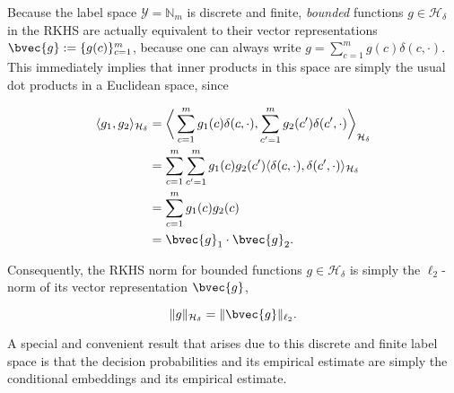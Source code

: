 \documentclass{article}
\begin{document}
	Because the label space $\mathcal{Y} = \mathbb{N}_{m}$ is discrete and finite, \textit{bounded} functions $g \in \mathcal{H}_{\delta}$ in the RKHS are actually equivalent to their vector representations $\bvec{g} := \{g(c)\}_{c = 1}^{m}$, because one can always write $g = \sum_{c = 1}^{m} g(c) \delta(c, \cdot)$. This immediately implies that inner products in this space are simply the usual dot products in a Euclidean space, since
	
	\begin{equation}
	\begin{aligned}
	\langle g_{1}, g_{2} \rangle_{\mathcal{H}_{\delta}} &= \bigg\langle \sum_{c = 1}^{m} g_{1}(c) \delta(c, \cdot), \sum_{c' = 1}^{m} g_{2}(c') \delta(c', \cdot)  \bigg\rangle_{\mathcal{H}_{\delta}} \\
	&= \sum_{c = 1}^{m} \sum_{c' = 1}^{m} g_{1}(c) g_{2}(c') \langle \delta(c, \cdot), \delta(c', \cdot) \rangle_{\mathcal{H}_{\delta}} \\
	&= \sum_{c = 1}^{m} g_{1}(c) g_{2}(c) \\
	&= \bvec{g}_{1} \cdot \bvec{g}_{2}.
	\end{aligned}
	\end{equation}
	
	Consequently, the RKHS norm for bounded functions $g \in \mathcal{H}_{\delta}$ is simply the $\ell_{2}$-norm of its vector representation $\bvec{g}$,
	
	\begin{equation}
	\lVert g \rVert_{\mathcal{H}_{\delta}} = \lVert \bvec{g} \rVert_{\ell_{2}}.
	\label{eq:rkhs_norm_is_l2_norm}
	\end{equation}

	A special and convenient result that arises due to this discrete and finite label space is that the decision probabilities and its empirical estimate are simply the conditional embeddings and its empirical estimate.
	
\end{document}
